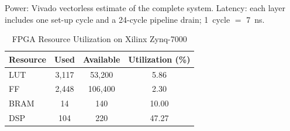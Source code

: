 \documentclass[conference]{IEEEtran}
\begin{document}
\begin{table}[t]
\vspace{2pt}
\parbox{\columnwidth}{\scriptsize Power: Vivado vectorless estimate of the complete system. Latency: each layer includes one set-up cycle and a 24-cycle pipeline drain; 1~cycle $=$ 7~ns.}
\end{table}
\begin{table}[t]
\renewcommand{\arraystretch}{1.15}
\caption{FPGA Resource Utilization on Xilinx Zynq-7000}
\label{tab:utilization}
\centering
\footnotesize
\begin{tabular}{lccc}
\toprule
\textbf{Resource} & \textbf{Used} & \textbf{Available} & \textbf{Utilization (\%)} \\
\midrule
LUT & 3,117 & 53,200 & 5.86 \\
FF & 2,448 & 106,400 & 2.30 \\
BRAM & 14 & 140 & 10.00 \\
DSP & 104 & 220 & 47.27 \\
\bottomrule
\end{tabular}
\end{table}
\end{document}

